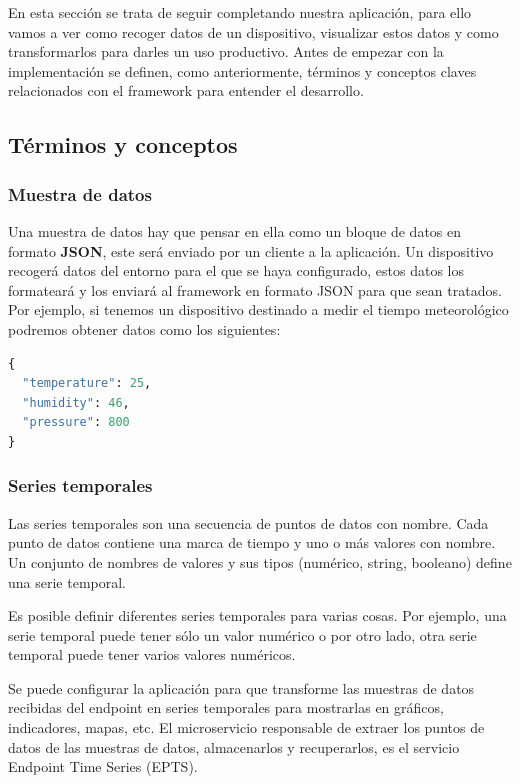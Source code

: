{En esta sección se trata de seguir completando nuestra aplicación, para ello vamos a ver como recoger datos de un dispositivo, visualizar estos datos y como transformarlos para darles un uso productivo. Antes de empezar con la implementación se definen, como anteriormente, términos y conceptos claves relacionados con el framework para entender el desarrollo. \cite{kaaiotCollectData}

\subsection{Términos y conceptos}

\subsubsection{Muestra de datos}

Una muestra de datos hay que pensar en ella como un bloque de datos en formato \textbf{JSON}, este será enviado por un cliente a la aplicación. Un dispositivo recogerá datos del entorno para el que se haya configurado, estos datos los formateará y los enviará al framework en formato JSON para que sean tratados. Por ejemplo, si tenemos un dispositivo destinado a medir el tiempo meteorológico podremos obtener datos como los siguientes:

\begin{lstlisting}[language=Python]
{
  "temperature": 25,
  "humidity": 46,
  "pressure": 800
}
\end{lstlisting}

\subsubsection{Series temporales}

Las series temporales son una secuencia de puntos de datos con nombre. Cada punto de datos contiene una marca de tiempo y uno o más valores con nombre. Un conjunto de nombres de valores y sus tipos (numérico, string, booleano) define una serie temporal.

Es posible definir diferentes series temporales para varias cosas. Por ejemplo, una serie temporal puede tener sólo un valor numérico o por otro lado, otra serie temporal puede tener varios valores numéricos.

Se puede configurar la aplicación para que transforme las muestras de datos recibidas del endpoint en series temporales para mostrarlas en gráficos, indicadores, mapas, etc. El microservicio responsable de extraer los puntos de datos de las muestras de datos, almacenarlos y recuperarlos, es el servicio Endpoint Time Series (EPTS).

}
